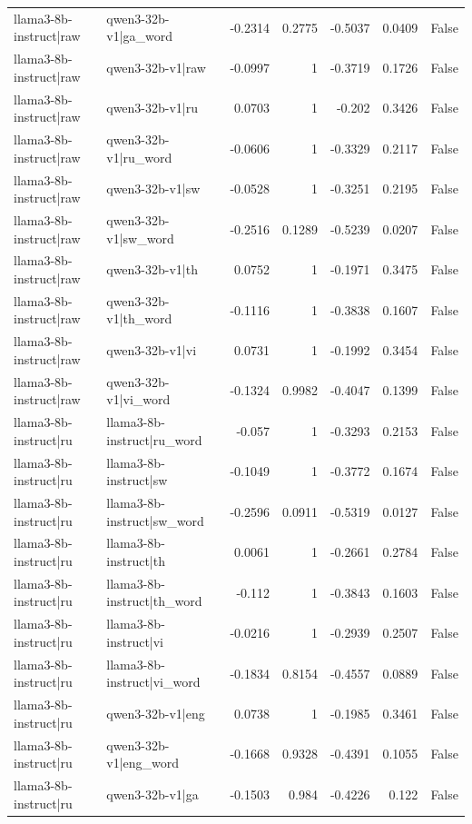 \begin{table}
\begin{tabular}{l l r r r r l}
llama3-8b-instruct|raw & qwen3-32b-v1|ga_word & -0.2314 & 0.2775 & -0.5037 & 0.0409 & False \\
llama3-8b-instruct|raw & qwen3-32b-v1|raw & -0.0997 & 1 & -0.3719 & 0.1726 & False \\
llama3-8b-instruct|raw & qwen3-32b-v1|ru & 0.0703 & 1 & -0.202 & 0.3426 & False \\
llama3-8b-instruct|raw & qwen3-32b-v1|ru_word & -0.0606 & 1 & -0.3329 & 0.2117 & False \\
llama3-8b-instruct|raw & qwen3-32b-v1|sw & -0.0528 & 1 & -0.3251 & 0.2195 & False \\
llama3-8b-instruct|raw & qwen3-32b-v1|sw_word & -0.2516 & 0.1289 & -0.5239 & 0.0207 & False \\
llama3-8b-instruct|raw & qwen3-32b-v1|th & 0.0752 & 1 & -0.1971 & 0.3475 & False \\
llama3-8b-instruct|raw & qwen3-32b-v1|th_word & -0.1116 & 1 & -0.3838 & 0.1607 & False \\
llama3-8b-instruct|raw & qwen3-32b-v1|vi & 0.0731 & 1 & -0.1992 & 0.3454 & False \\
llama3-8b-instruct|raw & qwen3-32b-v1|vi_word & -0.1324 & 0.9982 & -0.4047 & 0.1399 & False \\
llama3-8b-instruct|ru & llama3-8b-instruct|ru_word & -0.057 & 1 & -0.3293 & 0.2153 & False \\
llama3-8b-instruct|ru & llama3-8b-instruct|sw & -0.1049 & 1 & -0.3772 & 0.1674 & False \\
llama3-8b-instruct|ru & llama3-8b-instruct|sw_word & -0.2596 & 0.0911 & -0.5319 & 0.0127 & False \\
llama3-8b-instruct|ru & llama3-8b-instruct|th & 0.0061 & 1 & -0.2661 & 0.2784 & False \\
llama3-8b-instruct|ru & llama3-8b-instruct|th_word & -0.112 & 1 & -0.3843 & 0.1603 & False \\
llama3-8b-instruct|ru & llama3-8b-instruct|vi & -0.0216 & 1 & -0.2939 & 0.2507 & False \\
llama3-8b-instruct|ru & llama3-8b-instruct|vi_word & -0.1834 & 0.8154 & -0.4557 & 0.0889 & False \\
llama3-8b-instruct|ru & qwen3-32b-v1|eng & 0.0738 & 1 & -0.1985 & 0.3461 & False \\
llama3-8b-instruct|ru & qwen3-32b-v1|eng_word & -0.1668 & 0.9328 & -0.4391 & 0.1055 & False \\
llama3-8b-instruct|ru & qwen3-32b-v1|ga & -0.1503 & 0.984 & -0.4226 & 0.122 & False \\

\end{tabular}
\end{table}
